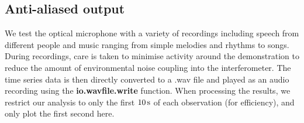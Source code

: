 \documentclass[paper-main.tex]{subfiles}
\begin{document}

\subsection{Anti-aliased output}
\label{sec:initialResultsOpMic}

We test the optical microphone with a variety of recordings including speech from different people and music ranging from simple melodies and rhythms to songs. During recordings, care is taken to minimise activity around the demonstration to reduce the amount of environmental noise coupling into the interferometer. The time series data is then directly converted to a .wav file and played as an audio recording using the \textbf{io.wavfile.write} function. When processing the results, we restrict our analysis to only the first $10\,{\rm s}$ of each observation (for efficiency), and only plot the first second here. 
\end{document}
